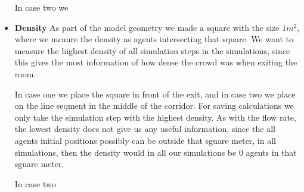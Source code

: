 \begin{itemize}
	    In case two we 
	    
    \item \textbf{Density} As part of the model geometry we made a square with the size $1 m^2$,
	    where we meaure the density as agents intersecting that square. We want to measure the highest density of all simulation steps
	    in the simulations, since this gives the most information of how dense the crowd was when exiting the room.
	    
	    In case one we place the square in front of the exit, and in case two we place on the line seqment in the middle of the corridor.
	    For saving calculations we only take the simulation step with the highest density.
	    As with the flow rate, the lowest density does not give us any useful information, since the all agents initial
	    positions possibly can be outside that sguare meter, in all simulations, then the density would in all our
	    simulations be 0 agents in that sguare meter.

	    In case two
\end{itemize}

